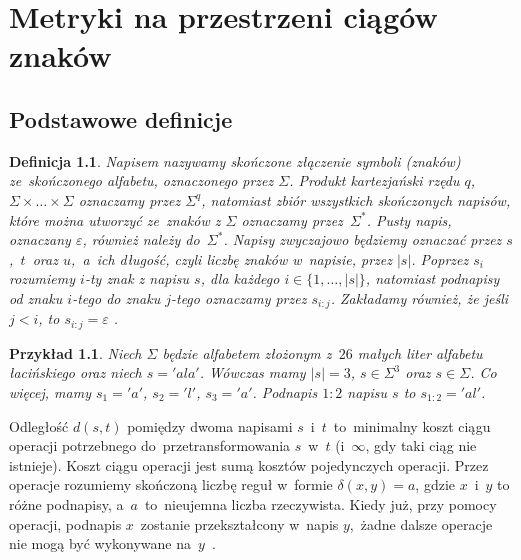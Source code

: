 \documentclass[12pt, twoside, openany]{report}
\theoremstyle{plain}
\newtheorem{defi}{Definicja}[section]
\newtheorem{prz}{Przykład}[section]
\begin{document}

%

\chapter{Metryki na przestrzeni ciągów
znaków}\label{metryki-na-przestrzeni-ciagow-znakow}

\section{Podstawowe definicje}

\begin{defi}
\emph{Napisem} nazywamy skończone złączenie symboli (znaków) ze~skończonego \emph{alfabetu}, oznaczonego przez $\Sigma$. Produkt kartezjański rzędu $q$, $\Sigma\times\ldots\times\Sigma$ oznaczamy przez $\Sigma^q$, natomiast zbiór wszystkich skończonych napisów, które można utworzyć ze~znaków z $\Sigma$ oznaczamy przez~$\Sigma^*$. \emph{Pusty napis}, oznaczany $\varepsilon$, również należy do~$\Sigma^*$. Napisy zwyczajowo będziemy oznaczać przez $s$,~$t$~oraz $u$,~a~ich \emph{długość}, czyli liczbę znaków w~napisie, przez $|s|$. Poprzez $s_i$ rozumiemy $i$-ty znak z napisu $s$, dla każdego $i \in \{1,\ldots,|s|\}$, natomiast podnapisy od znaku $i$-tego do znaku $j$-tego oznaczamy przez $s_{i:j}$. Zakładamy również, że jeśli $j<i$, to $s_{i:j} = \varepsilon$ \cite{Loo2014:stringdist}.
\end{defi}


\begin{prz}
Niech $\Sigma$ będzie alfabetem złożonym z~$26$ małych liter alfabetu łacińskiego oraz niech $s = 'ala'$. Wówczas mamy $|s| = 3$, $s \in \Sigma^3$ oraz $s \in \Sigma$. Co więcej, mamy $s_1 = 'a'$, $s_2 = 'l'$, $s_3 = 'a'$. Podnapis $1:2$ napisu $s$ to $s_{1:2} = 'al'$.
\end{prz}

Odległość $d(s,t)$ pomiędzy dwoma napisami $s$~i~$t$~to~minimalny koszt ciągu operacji potrzebnego do~przetransformowania $s$~w~$t$ (i~$\infty$, gdy taki ciąg nie istnieje). Koszt ciągu operacji jest sumą kosztów pojedynczych operacji. Przez operacje rozumiemy skończoną liczbę reguł w~formie $\delta(x, y) = a$, gdzie $x$~i~$y$ to różne podnapisy, a~$a$~to~nieujemna liczba rzeczywista. Kiedy już, przy pomocy operacji, podnapis $x$~zostanie przekształcony w~napis $y$,~żadne dalsze operacje nie mogą być wykonywane na~$y$~\cite{Navarro2001:guidedtour}.
\end{document}
